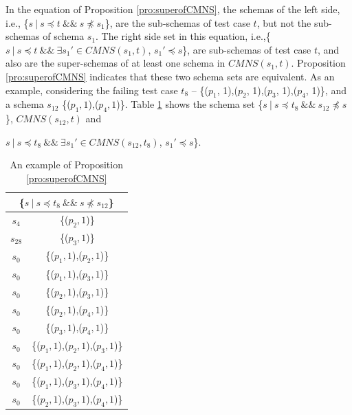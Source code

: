 In the equation of Proposition \ref{pro:superofCMNS}, the schemas of the left side, i.e., \{$s\ |\ s \preceq t\ \&\&\ s \npreceq s_{1}$\}, are the sub-schemas of test case $t$, but not the sub-schemas of schema $s_{1}$. The right side set in this equation, i.e.,\{$ s\ |\ s \preceq t \  \&\& \ \exists s_{1}' \in CMNS(s_{1}, t)$, $s_{1}' \preceq s$\}, are sub-schemas of test case $t$, and also are the super-schemas of at least one schema in $CMNS(s_{1}, t)$. Proposition \ref{pro:superofCMNS} indicates that these two schema sets are equivalent. As an example, considering the failing test case $t_{8}$ -- \{($p_{1}$, 1),($p_{2}$, 1),($p_{3}$, 1),($p_{4}$, 1)\}, and a schema $s_{12}$ \{($p_{1}, 1$),($p_{4}, 1$)\}. Table \ref{examleOfCMNSPro} shows the schema set  \{$s\ |\ s \preceq t_{8}\ \&\&\ s_{12} \npreceq s$\}, $CMNS(s_{12}, t)$ and {$ s\ |\ s \preceq t_{8}\ \&\& \ \exists s_{1}' \in CMNS(s_{12}, t_{8})$, $s_{1}' \preceq s$\}.

 \begin{table}[htbp]
  \centering
  \caption{An example of Proposition \ref{pro:superofCMNS}}
  \label{examleOfCMNSPro}
    \begin{tabular}{|c|c|} \hline
     \multicolumn{2}{|c|}{\{$s\ |\ s \preceq t_{8}\ \&\&\ s \npreceq s_{12}$\}} \\ \hline
   $s_{4}$ & \{($p_{2}, 1$)\} \\
   $s_{28}$ & \{($p_{3}, 1$)\} \\

   $s_{0}$ & \{($p_{1}, 1$),($p_{2}, 1$)\} \\
   $s_{0}$ & \{($p_{1}, 1$),($p_{3}, 1$)\} \\
   $s_{0}$ & \{($p_{2}, 1$),($p_{3}, 1$)\} \\
   $s_{0}$ & \{($p_{2}, 1$),($p_{4}, 1$)\} \\
   $s_{0}$ & \{($p_{3}, 1$),($p_{4}, 1$)\} \\

   $s_{0}$ & \{($p_{1}, 1$),($p_{2}, 1$),($p_{3}, 1$)\} \\
   $s_{0}$ & \{($p_{1}, 1$),($p_{2}, 1$),($p_{4}, 1$)\} \\
   $s_{0}$ & \{($p_{1}, 1$),($p_{3}, 1$),($p_{4}, 1$)\} \\
   $s_{0}$ & \{($p_{2}, 1$),($p_{3}, 1$),($p_{4}, 1$)\} \\


\end{tabular}
\end{table}}
